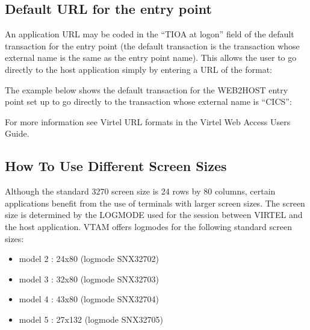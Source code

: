\documentclass[letterpaper,10pt,english]{sphinxmanual}
\begin{document}
\subsection{Default URL for the entry point}
\label{\detokenize{Customization:default-url-for-the-entry-point}}\label{\detokenize{Customization:index-64}}
An application URL may be coded in the “TIOA at logon” field of the default transaction for the entry point (the default transaction is the transaction whose external name is the same as the entry point name). This allows the user to go directly to the host application simply by entering a URL of the format:

\begin{sphinxVerbatim}[commandchars=\\\{\}]
\end{sphinxVerbatim}

The example below shows the default transaction for the WEB2HOST entry point set up to go directly to the transaction whose external name is “CICS”:



For more information see Virtel URL formats in the Virtel Web Access Users Guide.

\ignorespaces 

\subsection{How To Use Different Screen Sizes}
\label{\detokenize{Customization:how-to-use-different-screen-sizes}}\label{\detokenize{Customization:index-65}}
Although the standard 3270 screen size is 24 rows by 80 columns, certain applications benefit from the use of terminals with larger screen sizes. The screen size is determined by the LOGMODE used for the session between VIRTEL and the host application. VTAM offers logmodes for the following standard screen sizes:
\begin{itemize}
\item {} 
model 2 : 24x80 (logmode SNX32702)

\item {} 
model 3 : 32x80 (logmode SNX32703)

\item {} 
model 4 : 43x80 (logmode SNX32704)

\item {} 
model 5 : 27x132 (logmode SNX32705)

\end{itemize}
\end{document}
